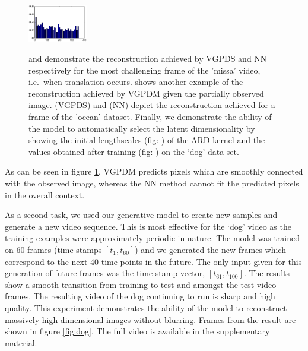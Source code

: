 \documentclass{article} %
\begin{document}
\begin{figure}[ht]
\begin{center}
{	\includegraphics[width=0.23\textwidth]{diagrams/dog_scalesInit}
	\label{fig:scalesDogInit}
}
\end{center}
\caption{\small{
 and  demonstrate the reconstruction achieved by VGPDS and NN respectively for the most challenging frame  of the 'missa' video, i.e.\ when translation occurs.  shows another example of the reconstruction achieved by VGPDM given the partially observed image.  (VGPDS) and  (NN) depict the reconstruction achieved for a frame of the 'ocean' dataset. 
Finally, we demonstrate the ability of the model to automatically select the latent dimensionality by showing the initial lengthscales (fig: ) of the ARD kernel and the values obtained after training (fig: ) on the `dog' data set.
}
}
\label{fig:video1}
\end{figure}
As can be seen in figure \ref{fig:video1}, VGPDM predicts pixels which are smoothly connected with the observed image, whereas the NN method cannot fit the predicted pixels in the overall context.


\par As a second task, we used our generative model to create new
samples and generate a new video sequence. This is most effective for
the `dog' video as the training examples were approximately periodic
in nature. The model was trained on 60 frames (time-stamps $[t_1,
t_{60}]$) and we generated the new frames which correspond to the next
40 time points in the future. The only input given for this generation
of future frames was the time stamp vector, $[t_{61}, t_{100}]$. The
results show a smooth transition from training to test and amongst the
test video frames. The resulting video of the dog continuing to run is
sharp and high quality. This experiment demonstrates the ability of
the model to reconstruct massively high dimensional images without
blurring. Frames from the result are shown in figure
\ref{fig:dog}. The full video is available in the supplementary
material.
\end{document}
